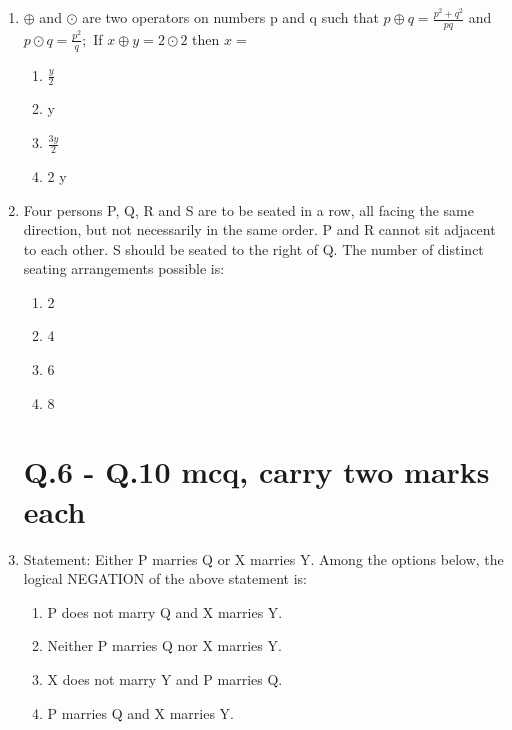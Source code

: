 \documentclass[journal,12pt,onecolumn]{IEEEtran}
\begin{document}
\begin{enumerate}
    \item $\oplus$ and $\odot$ are two operators on numbers p and q such that $p\oplus q=\frac{p^{2}+q^{2}}{pq}$ and $p\odot q=\frac{p^{2}}{q};$ If $x\oplus y=2\odot2$ then $x=$
    \begin{multicols}{2}
    \begin{enumerate}
        \item $\frac{y}{2}$
        \item y
        \item $\frac{3y}{2}$
        \item 2 y
    \end{enumerate}
    \end{multicols}
    \hfill{}
    
    \item Four persons P, Q, R and S are to be seated in a row, all facing the same direction, but not necessarily in the same order. P and R cannot sit adjacent to each other. S should be seated to the right of Q. The number of distinct seating arrangements possible is:
    \begin{multicols}{2}
    \begin{enumerate}
        \item 2
        \item 4
        \item 6
        \item 8
    \end{enumerate}
    \end{multicols}
    \hfill{}
\section*{Q.6 - Q.10 mcq, carry two marks each} 
    \item Statement: Either P marries Q or X marries Y. Among the options below, the logical NEGATION of the above statement is:
    \begin{multicols}{2}
    \begin{enumerate}
        \item P does not marry Q and X marries Y.
        \item Neither P marries Q nor X marries Y.
        \item X does not marry Y and P marries Q.
        \item P marries Q and X marries Y.
    \end{enumerate}
    \end{multicols}
    \hfill{}


\end{enumerate}
\end{document}
